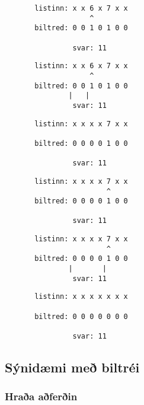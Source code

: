 { \begin{verbatim}
       listinn: x x 6 x 7 x x
                    ^
       biltred: 0 0 1 0 1 0 0

                svar: 11
\end{verbatim}}
{ \begin{verbatim}
       listinn: x x 6 x 7 x x
                    ^
       biltred: 0 0 1 0 1 0 0
               |   |
                svar: 11
\end{verbatim}}
{ \begin{verbatim}
       listinn: x x x x 7 x x

       biltred: 0 0 0 0 1 0 0

                svar: 11
\end{verbatim}}
{ \begin{verbatim}
       listinn: x x x x 7 x x
                        ^
       biltred: 0 0 0 0 1 0 0

                svar: 11
\end{verbatim}}
{ \begin{verbatim}
       listinn: x x x x 7 x x
                        ^
       biltred: 0 0 0 0 1 0 0
               |       |
                svar: 11
\end{verbatim}}
{ \begin{verbatim}
       listinn: x x x x x x x

       biltred: 0 0 0 0 0 0 0

                svar: 11
\end{verbatim}}
\subsection{Sýnidæmi með biltréi}
{
    \frametitle{Hraða aðferðin}
}

